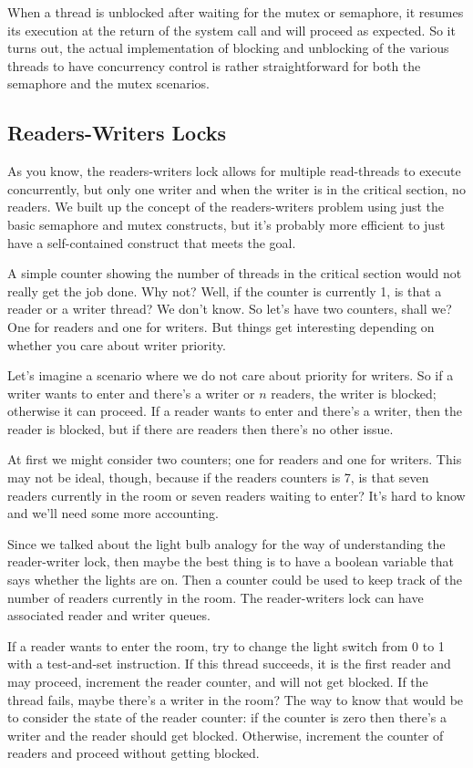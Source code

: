 When a thread is unblocked after waiting for the mutex or semaphore, it resumes its execution at the return of the system call and will proceed as expected. So it turns out, the actual implementation of blocking and unblocking of the various threads to have concurrency control is rather straightforward for both the semaphore and the mutex scenarios.


\subsection*{Readers-Writers Locks}

As you know, the readers-writers lock allows for multiple read-threads to execute concurrently, but only one writer and when the writer is in the critical section, no readers. We built up the concept of the readers-writers problem using just the basic semaphore and mutex constructs, but it's probably more efficient to just have a self-contained construct that meets the goal.

A simple counter showing the number of threads in the critical section would not really get the job done. Why not? Well, if the counter is currently 1, is that a reader or a writer thread? We don't know. So let's have two counters, shall we? One for readers and one for writers. But things get interesting depending on whether you care about writer priority. 

Let's imagine a scenario where we do not care about priority for writers. So if a writer wants to enter and there's a writer or $n$ readers, the writer is blocked; otherwise it can proceed. If a reader wants to enter and there's a writer, then the reader is blocked, but if there are readers then there's no other issue.

At first we might consider two counters; one for readers and one for writers. This may not be ideal, though, because if the readers counters is 7, is that seven readers currently in the room or seven readers waiting to enter? It's hard to know and we'll need some more accounting.

Since we talked about the light bulb analogy for the way of understanding the reader-writer lock, then maybe the best thing is to have a boolean variable that says whether the lights are on. Then a counter could be used to keep track of the number of readers currently in the room. The reader-writers lock can have associated reader and writer queues. 

If a reader wants to enter the room, try to change the light switch from 0 to 1 with a test-and-set instruction. If this thread succeeds, it is the first reader and may proceed, increment the reader counter, and will not get blocked. If the thread fails, maybe there's a writer in the room? The way to know that would be to consider the state of the reader counter: if the counter is zero then there's a writer and the reader should get blocked. Otherwise, increment the counter of readers and proceed without getting blocked.

